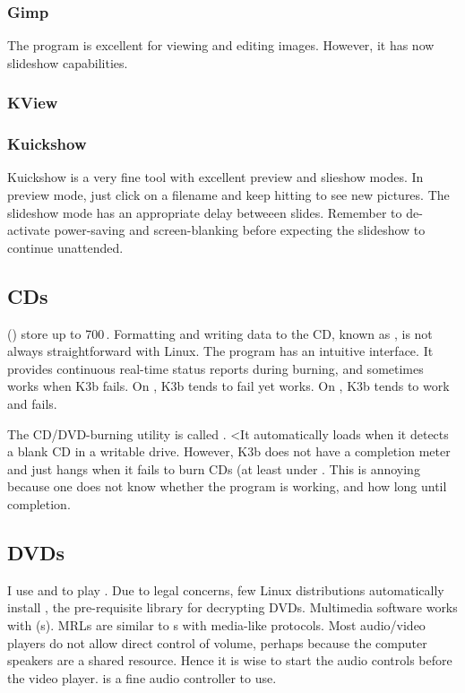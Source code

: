 \documentclass[12pt,twoside]{article}
\begin{document}
\subsubsection{Gimp}\label{sxn:gimp}
The  program is excellent for viewing and editing images.
However, it has now slideshow capabilities.

\subsubsection{KView}\label{sxn:kview}
\subsubsection{Kuickshow}\label{sxn:kuickshow}
Kuickshow is a very fine tool with excellent preview and slieshow
modes.
In preview mode, just click on a filename and keep hitting 
 to see new pictures.
The slideshow mode has an appropriate delay betweeen slides.
Remember to de-activate power-saving and screen-blanking before
expecting the slideshow to continue unattended.

\subsection{CDs}\label{sxn:cd}
 () store up to 700\,\MB.
Formatting and writing data to the CD, known as , is
not always straightforward with Linux.
The program  has an intuitive interface.
It provides continuous real-time status reports during burning, and
sometimes works when K3b fails.
On , K3b tends to fail yet
 works. 
On , K3b tends to work and 
 fails. 

The  CD/DVD-burning utility is called .
<It automatically loads when it detects a blank CD in a writable drive.
However, K3b does not have a completion meter and just hangs when it
fails to burn CDs (at least under .  
This is annoying because one does not know whether the program is
working, and how long until completion.

\subsection{DVDs}\label{sxn:dvd}
I use  and  to play .
Due to legal concerns, few Linux distributions automatically install
, the pre-requisite library for decrypting DVDs.
Multimedia software works with 
(s). 
MRLs are similar to s with media-like protocols.
Most audio/video players do not allow direct control of volume,
perhaps because the computer speakers are a shared resource.
Hence it is wise to start the audio controls before the video player.
 is a fine audio controller to use.
\end{document}
